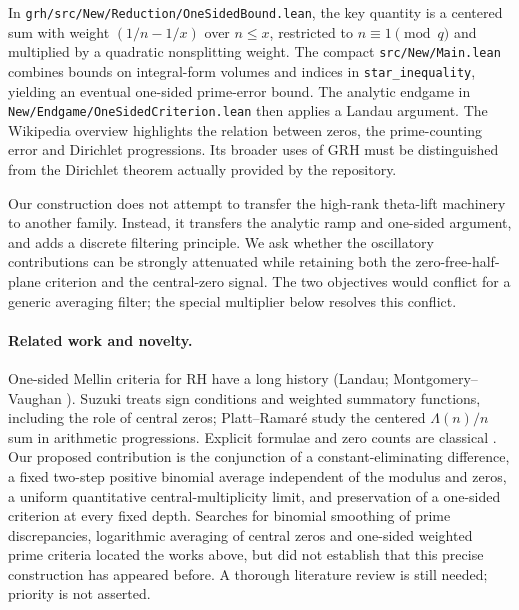 \documentclass[11pt]{article}
\theoremstyle{remark}\newtheorem{remark}[theorem]{Remark}
\begin{document}
In \texttt{grh/src/New/Reduction/OneSidedBound.lean}, the key quantity is a centered sum with weight $(1/n-1/x)$ over $n\le x$, restricted to $n\equiv1\pmod q$ and multiplied by a quadratic nonsplitting weight. The compact \texttt{src/New/Main.lean} combines bounds on integral-form volumes and indices in \texttt{star\_inequality}, yielding an eventual one-sided prime-error bound. The analytic endgame in \texttt{New/Endgame/OneSidedCriterion.lean} then applies a Landau argument. The Wikipedia overview \cite{wiki} highlights the relation between zeros, the prime-counting error and Dirichlet progressions. Its broader uses of GRH must be distinguished from the Dirichlet theorem actually provided by the repository.

Our construction does not attempt to transfer the high-rank theta-lift machinery to another family. Instead, it transfers the analytic ramp and one-sided argument, and adds a discrete filtering principle. We ask whether the oscillatory contributions can be strongly attenuated while retaining both the zero-free-half-plane criterion and the central-zero signal. The two objectives would conflict for a generic averaging filter; the special multiplier below resolves this conflict.

\paragraph{Related work and novelty.} One-sided Mellin criteria for RH have a long history (Landau; Montgomery--Vaughan \cite{mv}). Suzuki \cite{suzuki} treats sign conditions and weighted summatory functions, including the role of central zeros; Platt--Ramar\'e \cite{pr} study the centered $\Lambda(n)/n$ sum in arithmetic progressions. Explicit formulae and zero counts are classical \cite{dav,bennett}. Our proposed contribution is the conjunction of a constant-eliminating difference, a fixed two-step positive binomial average independent of the modulus and zeros, a uniform quantitative central-multiplicity limit, and preservation of a one-sided criterion at every fixed depth. Searches for binomial smoothing of prime discrepancies, logarithmic averaging of central zeros and one-sided weighted prime criteria located the works above, but did not establish that this precise construction has appeared before. A thorough literature review is still needed; priority is not asserted.
\end{document}
